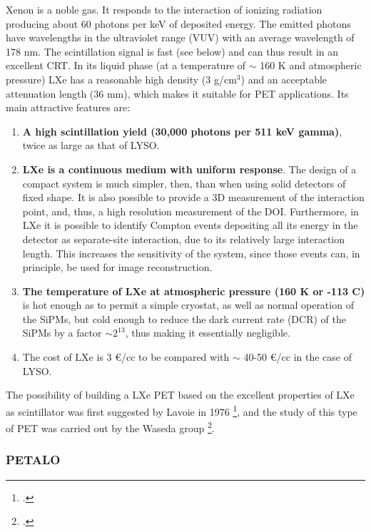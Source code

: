 Xenon is a noble gas. It responds to the interaction of ionizing radiation producing about 60 photons per keV of deposited energy. The emitted photons have wavelengths in the ultraviolet range (VUV)
with an average wavelength of 178 nm. The scintillation signal is fast 
(see below) and can thus result in an excellent CRT.  In its liquid phase (at a temperature of $\sim$ 160 K and atmospheric pressure) LXe has a reasonable high density (3 g/cm$^3$) and an acceptable attenuation length (36 mm), which makes it suitable for PET applications. Its main attractive features are:

\begin{enumerate}
\item {\bf A high scintillation yield (30,000 photons per 511 keV gamma)}, twice as large as that of LYSO. 
\item {\bf LXe is a continuous medium with uniform response}. The design of a compact system is much simpler, then, than when using solid detectors of fixed shape. It is also possible to provide a 3D measurement of the interaction point, and, thus, a high resolution measurement of the DOI. Furthermore, in LXe it is possible to identify Compton events depositing all its energy in the detector as separate-site interaction, due to its relatively large interaction length. This increases the sensitivity of the system, since those events can, in principle, be used for image reconstruction. 
\item {\bf The temperature of LXe at atmospheric pressure (160 K or -113 C)} is hot enough as to permit a simple cryostat, as well as normal operation of the SiPMs, but cold enough to reduce the dark current rate (DCR) of the SiPMs by a factor $\sim 2^{13}$, thus making it essentially negligible. 
\item {The cost} of LXe is 3 \euro/cc to be compared with $\sim$ 40-50 \euro/cc in the case of LYSO. 
 \end{enumerate}

The possibility of building a LXe PET based on the excellent properties of LXe as scintillator was first suggested by Lavoie in 1976  \footcite{lavoie}, and the study of this type of PET was carried out by the Waseda group \footcite{Doke1,Nishikido2,Nishikido1}. 

\subsubsection*{PETALO}


